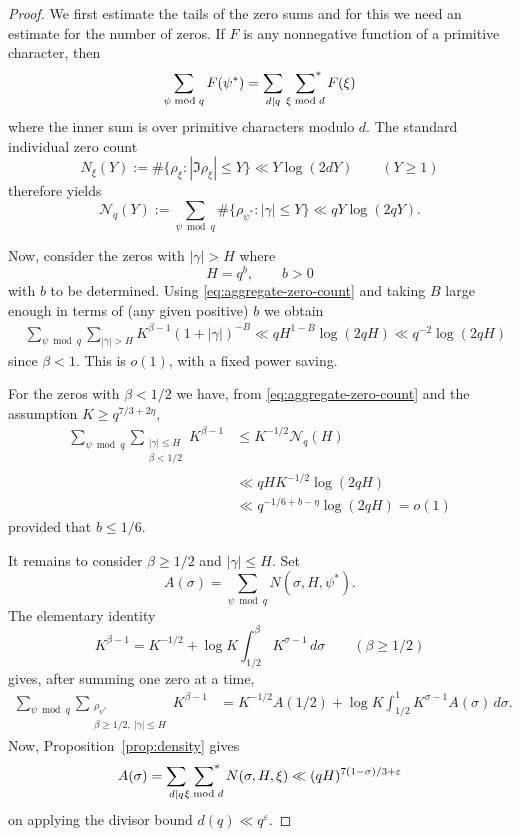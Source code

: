 \documentclass[12pt, oneside]{amsart}
\theoremstyle{definition}
\newcommand{\leqs}{\leqslant }
\newcommand{\geqs}{\geqslant }
\newcommand{\eps}{\varepsilon}
\newcommand{\1}{\mathds{1}}
\begin{document}
\begin{proof}
We first estimate the tails of the zero sums and for this we need an estimate for the number of zeros. If $F$ is any
nonnegative function of a primitive character, then
\begin{equation*}
 \sum_{\psi\bmod q}F(\psi^*)
 =\sum_{d\mid q}\ \sideset{}{^*}\sum_{\xi\bmod d}F(\xi)
\end{equation*}
where the inner sum is over primitive characters modulo $d$. The
standard individual zero count
\[
 N_\xi(Y):=\#\{\rho_\xi:|\Im\rho_\xi|\leqs Y\}
 \ll Y\log(2dY) \qquad (Y\geqs1)
\]
therefore yields
\begin{equation}
 \mathcal N_q(Y):=
 \sum_{\psi\bmod q}
 \#\{\rho_{\psi^*}:|\gamma|\leqs Y\}
 \ll qY\log(2qY).
 \label{eq:aggregate-zero-count}
\end{equation}


Now, consider the zeros with $|\gamma|>H$ where  
\[
H=q^b,\qquad b>0
\] 
with $b$ to be determined.
Using
\eqref{eq:aggregate-zero-count} and taking $B$ large enough in terms of (any given positive) $b$ we obtain
\begin{align*}
 &\sum_{\psi\bmod q}\sum_{|\gamma|>H}
 K^{\beta-1}(1+|\gamma|)^{-B}
 \ll qH^{1-B}\log(2qH)
 \ll q^{-2}\log(2qH)
\end{align*}
since $\beta<1$. This is $o(1)$, with a fixed power saving.

For the zeros with $\beta<1/2$ we have, from
\eqref{eq:aggregate-zero-count} and the assumption $K\geqs q^{7/3+2\eta}$,
\begin{equation*}\begin{split}
 \sum_{\psi\bmod q}
 \sum_{\substack{|\gamma|\leqs H\\\beta<1/2}}K^{\beta-1}
 &\leqs K^{-1/2}\mathcal N_q(H) \\
 &\ll qHK^{-1/2}\log(2qH) \\
 &\ll q^{-1/6+b-\eta}\log(2qH)=o(1)
 \label{eq:left-zero-range}
\end{split}
\end{equation*}
provided that $b\leqs1/6$.

It remains to consider $\beta\geqs1/2$ and $|\gamma|\leqs H$.  Set
\[
 A(\sigma)=\sum_{\psi\bmod q}N(\sigma,H,\psi^*).
\]
The elementary identity
\[
 K^{\beta-1}=K^{-1/2}
 +\log K\int_{1/2}^{\beta}K^{\sigma-1}\,d\sigma
 \qquad (\beta\geqs1/2)
\]
gives, after summing one zero at a time,
\begin{align}
{\sum_{\psi\bmod q}}
   {\sum_{\substack{\rho_{\psi^*}\\
          \beta\geqs1/2,\ |\gamma|\leqs H}}}K^{\beta-1}
 &=K^{-1/2}A(1/2)
 +\log K\int_{1/2}^{1}K^{\sigma-1}A(\sigma)\,d\sigma.
 \label{eq:layer-cake-identity}
\end{align}
Now, Proposition~\ref{prop:density} gives 
\begin{equation}
 A(\sigma)
 =
 \sum_{d|q}\sideset{}{^*}\sum_{\xi\bmod d}N(\sigma,H,\xi)
 \ll (qH)^{7(1-\sigma)/3+\eps}
 \label{eq:density-in-prime-proof}
\end{equation}
on applying the divisor bound $d(q)\ll q^\eps$. 


\end{proof}
\end{document}
